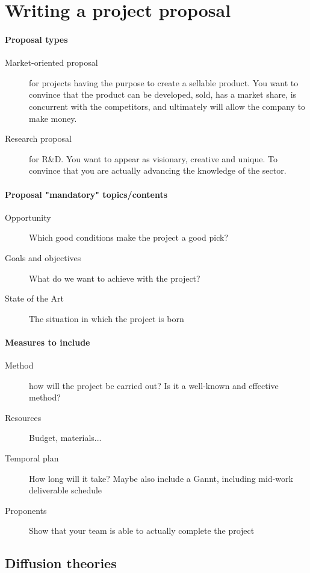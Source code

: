 \documentclass{article}
\begin{document}
\section{Writing a project proposal}
\paragraph{Proposal types}
\begin{description}
\item[Market-oriented proposal] for projects having the purpose to create a sellable product. You want to convince that the product can be developed, sold, has a market share, is concurrent with the competitors, and ultimately will allow the company to make money.
\item[Research proposal] for R\&D. You want to appear as visionary, creative and unique. To convince that you are actually advancing the knowledge of the sector.
\end{description}

\paragraph{Proposal "mandatory" topics/contents}
\begin{description}
\item[Opportunity] Which good conditions make the project a good pick?
\item[Goals and objectives] What do we want to achieve with the project?
\item[State of the Art] The situation in which the project is born
\end{description}

\paragraph{Measures to include}
\begin{description}
\item[Method] how will the project be carried out? Is it a well-known and effective method?
\item[Resources] Budget, materials...
\item[Temporal plan] How long will it take? Maybe also include a Gannt, including mid-work deliverable schedule
\item[Proponents] Show that your team is able to actually complete the project
\end{description}

\subsection{Diffusion theories}
\label{subsec:diffusion_theories}
\end{document}
